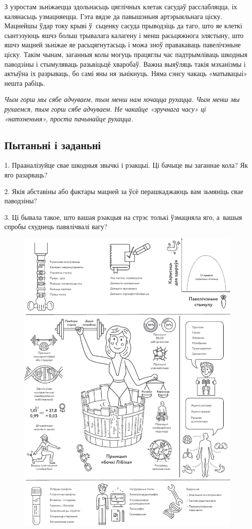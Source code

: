 З узростам зьніжаецца здольнасьць цяглічных клетак сасудаў расслабляцца, іх калянасьць узмацняецца. Гэта вядзе да павышэньня артэрыяльнага ціску. Мацнейшы ўдар току крыві ў~сьценку сасуда прыводзіць да таго, што яе клеткі сынтэзуюць яшчэ больш трывалага калагену і менш расьцяжнога элястыну, што яшчэ мацней зьніжае яе расьцягнутасьць і можа зноў правакаваць павелічэньне ціску. Такім чынам, заганныя колы могуць працяглы час падтрымліваць шкодныя паводзіны і стымуляваць разьвіцьцё хваробаў. Важна выяўляць такія мэханізмы і актыўна іх разрываць, бо самі яны ня зьнікнуць. Няма сэнсу чакаць «матывацыі» нешта рабіць.

\emph{Чым горш мы сябе адчуваем, тым менш нам хочацца рухацца. Чым менш мы рухаемся, тым горш сябе адчуваем. Не чакайце «зручнага часу» ці «натхненьня», проста пачынайце рухацца.}

\subsection*{Пытаньні і заданьні}

1. Прааналізуйце свае шкодныя звычкі і рэакцыі. Ці бачыце вы заганнае кола? Як яго разарваць?

2. Якія абставіны або фактары мацней за ўсё перашкаджаюць вам зьмяніць свае паводзіны?

3. Ці бывала такое, што вашая рэакцыя на стрэс толькі ўзмацняла яго, а~вашыя спробы схуднець павялічвалі вагу?

\clearpage
\thispagestyle{empty}
\begin{figure}[htb!]
  \vspace*{-0.5in}
  \includegraphics[width=\textwidth]{willpower/ch3/full.pdf}  
\end{figure}

